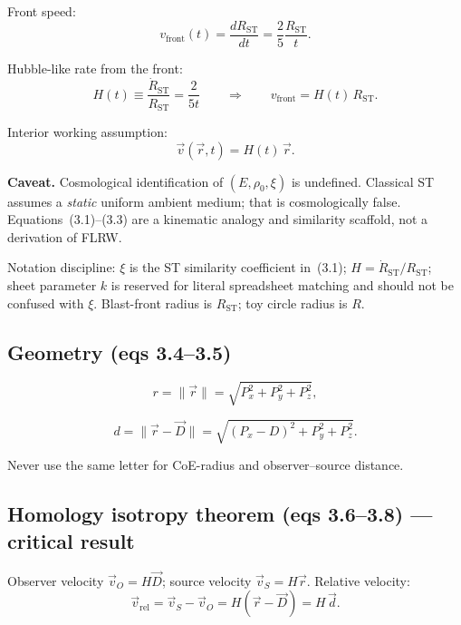 \documentclass[11pt,a4paper]{article}
\begin{document}
Front speed:
\begin{equation}
v_{\mathrm{front}}(t)=\frac{dR_{\mathrm{ST}}}{dt}=\frac{2}{5}\frac{R_{\mathrm{ST}}}{t}. \tag{3.2}\label{eq:3.2}
\end{equation}

Hubble-like rate from the front:
\begin{equation}
H(t)\equiv\frac{\dot{R}_{\mathrm{ST}}}{R_{\mathrm{ST}}}=\frac{2}{5t}\qquad\Rightarrow\qquad v_{\mathrm{front}}=H(t)\,R_{\mathrm{ST}}. \tag{3.3}\label{eq:3.3}
\end{equation}

Interior working assumption:
\[
\vec{v}(\vec{r},t)=H(t)\,\vec{r}.
\]

\textbf{Caveat.} Cosmological identification of \((E,\rho_0,\xi)\) is undefined. Classical ST assumes a \emph{static} uniform ambient medium; that is cosmologically false. Equations~(3.1)--(3.3) are a kinematic analogy and similarity scaffold, not a derivation of FLRW.

Notation discipline: \(\xi\) is the ST similarity coefficient in~(3.1); \(H=\dot{R}_{\mathrm{ST}}/R_{\mathrm{ST}}\); sheet parameter \(k\) is reserved for literal spreadsheet matching and should not be confused with \(\xi\). Blast-front radius is \(R_{\mathrm{ST}}\); toy circle radius is \(R\).

\subsection{Geometry (eqs 3.4--3.5)}

\begin{equation}
r=\|\vec{r}\|=\sqrt{P_x^2+P_y^2+P_z^2}, \tag{3.4}\label{eq:3.4}
\end{equation}

\begin{equation}
d=\|\vec{r}-\vec{D}\|=\sqrt{(P_x-D)^2+P_y^2+P_z^2}. \tag{3.5}\label{eq:3.5}
\end{equation}

Never use the same letter for CoE-radius and observer--source distance.

\subsection{Homology isotropy theorem (eqs 3.6--3.8) --- critical result}

Observer velocity \(\vec{v}_O=H\vec{D}\); source velocity \(\vec{v}_S=H\vec{r}\). Relative velocity:
\begin{equation}
\vec{v}_{\mathrm{rel}}=\vec{v}_S-\vec{v}_O=H(\vec{r}-\vec{D})=H\,\vec{d}. \tag{3.6}\label{eq:3.6}
\end{equation}
\end{document}
